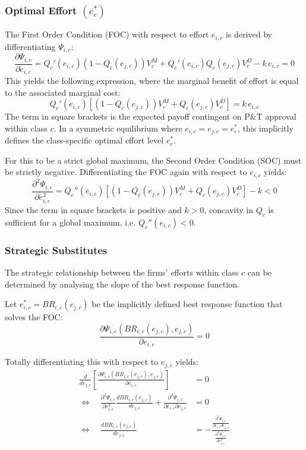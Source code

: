 \documentclass[12pt]{article}
\begin{document}
\subsubsection{Optimal Effort \texorpdfstring{$(e_c^*)$}{(ec*)}}
The First Order Condition (FOC) with respect to effort $e_{i,c}$ is derived by differentiating $\Psi_{i,c}$:
\begin{equation}
    \frac{\partial \Psi_{i,c}}{\partial e_{i,c}} = Q_c'(e_{i,c})(1-Q_c(e_{j,c})) V_c^M + Q_c'(e_{i,c})Q_c(e_{j,c}) V_c^D - k \, e_{i,c} = 0
\end{equation}
This yields the following expression, where the marginal benefit of effort is equal to the associated marginal cost:
\begin{equation} \label{eq:FOC_final}
    Q_c'(e_{i,c}) \left[ (1-Q_c(e_{j,c})) V_c^M + Q_c(e_{j,c}) V_c^D \right] = k \, e_{i,c}
\end{equation}
The term in square brackets is the expected payoff contingent on P\&T approval within class $c$. In a symmetric equilibrium where $e_{i,c} = e_{j,c} = e_c^*$, this implicitly defines the class-specific optimal effort level $e_c^*$. 

For this to be a strict global maximum, the Second Order Condition (SOC) must be strictly negative. Differentiating the FOC again with respect to $e_{i,c}$ yields:
\begin{equation}
    \frac{\partial^2 \Psi_{i,c}}{\partial e_{i,c}^2} = Q_c''(e_{i,c}) \left[ (1-Q_c(e_{j,c})) V_c^M + Q_c(e_{j,c}) V_c^D \right] - k < 0
\end{equation}
Since the term in square brackets is positive and $k>0$, concavity in $Q_c$ is sufficient for a global maximum, i.e. $Q_c''(e_{i,c})<0$.

\subsubsection{Strategic Substitutes}
The strategic relationship between the firms' efforts within class $c$ can be determined by analysing the slope of the best response function.

Let $e^*_{i,c} = BR_{i,c}(e_{j,c})$ be the implicitly defined best response function that solves the FOC:
\begin{equation}
    \frac{\partial \Psi_{i,c} (BR_{i,c}(e_{j,c}), e_{j,c})}{\partial e_{i,c}} = 0
\end{equation}

Totally differentiating this with respect to $e_{j,c}$ yields:
\begin{align}
    \frac{d}{d e_{j,c}}\left[\frac{\partial \Psi_{i,c}(BR_{i,c}(e_{j,c}),e_{j,c})}{\partial e_{i,c}}\right] &= 0 \\[0.5em]
    \Longleftrightarrow \quad
    \frac{\partial^2 \Psi_{i,c}}{\partial e_{i,c}^2}\frac{d BR_{i,c}(e_{j,c})}{d e_{j,c}}
    +
    \frac{\partial^2 \Psi_{i,c}}{\partial e_{i,c} \partial e_{j,c}} &= 0 \\[0.5em]
    \Longleftrightarrow \quad
    \frac{d BR_{i,c}(e_{j,c})}{d e_{j,c}}
    &=
    -
    \frac{\frac{\partial^2 \Psi_{i,c}}{\partial e_{i,c} \partial e_{j,c}}}
    {\frac{\partial^2 \Psi_{i,c}}{\partial e_{i,c}^2}}
\end{align}
\end{document}
